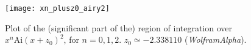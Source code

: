 \documentclass[a4paper,10pt]{article}
\newcommand{\D}{\mathrm{d}}
\newcommand{\Ai}{\mathrm{Ai}}
\begin{document}
% 
\begin{figure}[h!]
  \centering
  \texttt{[image: xn\_plusz0\_airy2]}
  \caption{Plot of the (significant part of the) region of integration over $x^n \Ai(x+z_0)^2$, for $n = 0,1,2$. $z_0 \simeq -2.338110$ (\emph{WolframAlpha}).}
  \label{fig:xnAiry2}
\end{figure}
\end{document}
